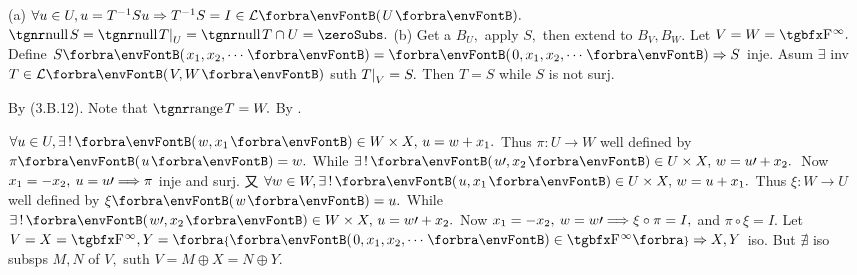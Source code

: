 
(a) $\forall u\in U,u=T^{-1}Su\Rightarrow T^{-1}S=I\in\Lm{U}.$ \Or $\null S=\null T\mmid_U=\null T\cap U=\zeroSubs.$\parSol{}
(b) Get a $B_U,$ apply $S,$ then extend to $B_V,B_W.$\PfEnd\vspace{2pt}
\AExa Let $V=W=\FbbP{\infty}.$ Define $S\Par{x_1,x_2,\cdots}=\Par{0,x_1,x_2,\cdots}\Rightarrow S$ inje.\parExa
Asum $\exists$ inv $T\in\Lm{V,W}$ suth $T\text{\normalsize|}_V=S.$ Then $T=S$ while $S$ is not surj.\SepLine

By (3.B.12). Note that $\range T=W.$ \; \Or {} \;By .\PfEnd\vspace{-2pt}
\SepLine

$\forall u\in U,\exists\,!\,\Par{w,x_1}\in W\times X,\,u=w+x_1.$ Thus $\pi:U\rightarrow W$ well defined by $\pi\Par{u}=w.$\parSol{}
While $\exists\,!\,\Par{u\apostrophe,x_2}\in U\times X,\,w=u\apostrophe+x_2.$ \,Now $x_1=-x_2,\:u=u\prime\Longrightarrow\pi$ inje and surj.\parSol{\vspace{3pt}}
\Or 又 $\forall w\in W,\exists\,!\,\Par{u,x_1}\in U\times X,\,w=u+x_1.$ Thus $\xi:W\rightarrow U$ well defined by $\xi\Par{w}=u.$\parSol{}
While $\exists\,!\,\Par{w\apostrophe,x_2}\in W\times X,\,u=w\apostrophe+x_2.$ Now $x_1=-x_2,\:w=w\prime\Longrightarrow\xi\circ\pi=I,$ and $\pi\circ\xi=I.$\PfEnd\vspace{4pt}
\AExa Let $V=X=\FbbP{\infty},Y=\Bra{\Par{0,x_1,x_2,\cdots}\in\FbbP{\infty}}\Rightarrow X,Y$ iso.\parExa
But $\nexists$ iso subsps $M,N$ of $V,$ suth $V=M\oplus X=N\oplus Y.$
\SepLine


